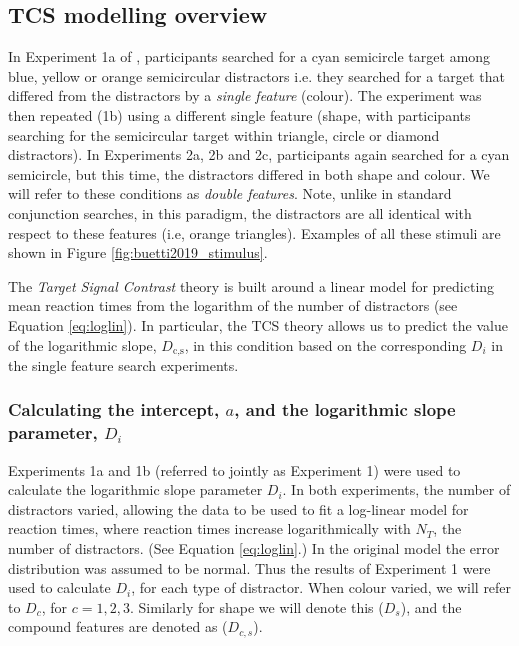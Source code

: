 \documentclass[preprint,12pt,authoryear]{elsarticle}
\begin{document}
\subsection{TCS modelling overview} 

In Experiment 1a of \cite{buetti2019predicting}, participants searched for a cyan semicircle target among blue, yellow or orange semicircular distractors i.e. they searched for a target that differed from the distractors by a \textit{single feature} (colour). The experiment was then repeated (1b) using a different single feature (shape, with participants searching for the semicircular target within triangle, circle or diamond distractors). In Experiments 2a, 2b and 2c, participants again searched for a cyan semicircle, but this time, the distractors differed in both shape and colour. We will refer to these conditions as \textit{double features}. Note, unlike in standard conjunction searches, in this paradigm, the distractors are all identical with respect to these features (i.e, orange triangles). Examples of all these stimuli are shown in Figure \ref{fig:buetti2019_stimulus}.

The \textit{Target Signal Contrast} theory is built around a linear model for predicting mean reaction times from the logarithm of the number of distractors (see Equation \ref{eq:loglin}). In particular, the TCS theory allows us to predict the value of the logarithmic slope, $D_\text{c,s}$, in this condition based on the corresponding $D_i$ in the single feature search experiments. 

\subsubsection{Calculating the intercept, $a$, and the logarithmic slope parameter, $D_i$}
\label{sec:fitting_D}

Experiments 1a and 1b (referred to jointly as Experiment 1) were used to calculate the logarithmic slope parameter $D_i$. In both experiments, the number of distractors varied, allowing the data to be used to fit a log-linear model for reaction times, where reaction times increase logarithmically with $N_T$, the number of distractors. (See Equation \ref{eq:loglin}.) In the original model the error distribution was assumed to be normal. Thus the results of Experiment 1 were used to calculate $D_i$, for each type of distractor. When colour varied, we will refer to $D_c$, for $c=1,2,3$. Similarly for shape we will denote this ($D_s$), and the compound features are denoted as ($D_{c,s}$). 
\end{document}
